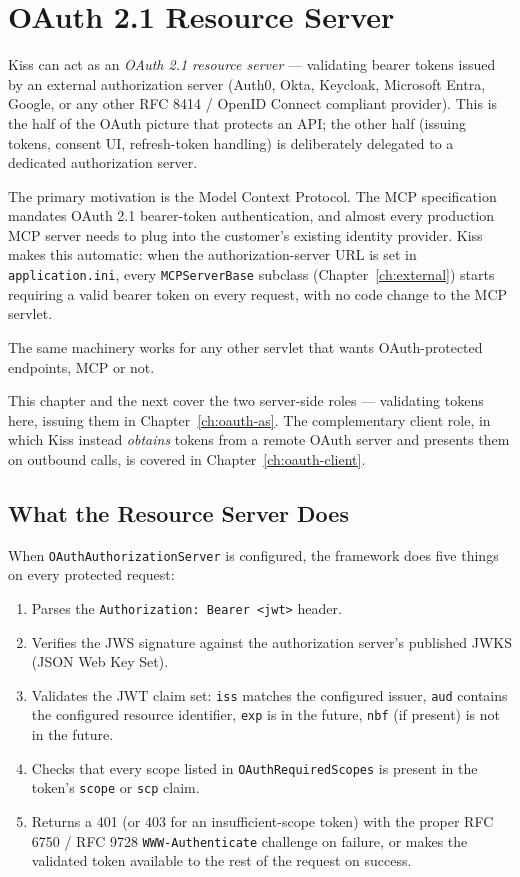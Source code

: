 \chapter{OAuth 2.1 Resource Server}
\label{ch:oauth}

Kiss can act as an \emph{OAuth 2.1 resource server} --- validating bearer tokens issued by an external authorization server (Auth0, Okta, Keycloak, Microsoft Entra, Google, or any other RFC 8414 / OpenID Connect compliant provider).  This is the half of the OAuth picture that protects an API; the other half (issuing tokens, consent UI, refresh-token handling) is deliberately delegated to a dedicated authorization server.

The primary motivation is the Model Context Protocol.  The MCP specification mandates OAuth 2.1 bearer-token authentication, and almost every production MCP server needs to plug into the customer's existing identity provider.  Kiss makes this automatic: when the authorization-server URL is set in \texttt{application.ini}, every \texttt{MCPServerBase} subclass (Chapter~\ref{ch:external}) starts requiring a valid bearer token on every request, with no code change to the MCP servlet.

The same machinery works for any other servlet that wants OAuth-protected endpoints, MCP or not.

This chapter and the next cover the two server-side roles --- validating tokens here, issuing them in Chapter~\ref{ch:oauth-as}.  The complementary client role, in which Kiss instead \emph{obtains} tokens from a remote OAuth server and presents them on outbound calls, is covered in Chapter~\ref{ch:oauth-client}.

\section{What the Resource Server Does}
\label{sec:oauth-overview}

When \texttt{OAuthAuthorizationServer} is configured, the framework does five things on every protected request:

\begin{enumerate}
  \item Parses the \texttt{Authorization: Bearer <jwt>} header.
  \item Verifies the JWS signature against the authorization server's published JWKS (JSON Web Key Set).
  \item Validates the JWT claim set: \texttt{iss} matches the configured issuer, \texttt{aud} contains the configured resource identifier, \texttt{exp} is in the future, \texttt{nbf} (if present) is not in the future.
  \item Checks that every scope listed in \texttt{OAuthRequiredScopes} is present in the token's \texttt{scope} or \texttt{scp} claim.
  \item Returns a 401 (or 403 for an insufficient-scope token) with the proper RFC 6750 / RFC 9728 \texttt{WWW-Authenticate} challenge on failure, or makes the validated token available to the rest of the request on success.
\end{enumerate}

